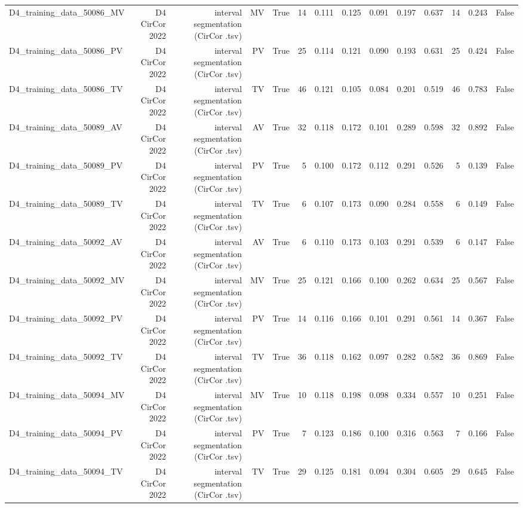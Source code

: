 \begin{table}[htbp]
\begin{tabular}{lrrrrrrrrrrrrr}
    D4\_training\_data\_50086\_MV & D4 CirCor 2022 & interval segmentation (CirCor .tsv) & MV & True & 14 & 0.111 & 0.125 & 0.091 & 0.197 & 0.637 & 14 & 0.243 & False \\
    D4\_training\_data\_50086\_PV & D4 CirCor 2022 & interval segmentation (CirCor .tsv) & PV & True & 25 & 0.114 & 0.121 & 0.090 & 0.193 & 0.631 & 25 & 0.424 & False \\
    D4\_training\_data\_50086\_TV & D4 CirCor 2022 & interval segmentation (CirCor .tsv) & TV & True & 46 & 0.121 & 0.105 & 0.084 & 0.201 & 0.519 & 46 & 0.783 & False \\
    D4\_training\_data\_50089\_AV & D4 CirCor 2022 & interval segmentation (CirCor .tsv) & AV & True & 32 & 0.118 & 0.172 & 0.101 & 0.289 & 0.598 & 32 & 0.892 & False \\
    D4\_training\_data\_50089\_PV & D4 CirCor 2022 & interval segmentation (CirCor .tsv) & PV & True & 5 & 0.100 & 0.172 & 0.112 & 0.291 & 0.526 & 5 & 0.139 & False \\
    D4\_training\_data\_50089\_TV & D4 CirCor 2022 & interval segmentation (CirCor .tsv) & TV & True & 6 & 0.107 & 0.173 & 0.090 & 0.284 & 0.558 & 6 & 0.149 & False \\
    D4\_training\_data\_50092\_AV & D4 CirCor 2022 & interval segmentation (CirCor .tsv) & AV & True & 6 & 0.110 & 0.173 & 0.103 & 0.291 & 0.539 & 6 & 0.147 & False \\
    D4\_training\_data\_50092\_MV & D4 CirCor 2022 & interval segmentation (CirCor .tsv) & MV & True & 25 & 0.121 & 0.166 & 0.100 & 0.262 & 0.634 & 25 & 0.567 & False \\
    D4\_training\_data\_50092\_PV & D4 CirCor 2022 & interval segmentation (CirCor .tsv) & PV & True & 14 & 0.116 & 0.166 & 0.101 & 0.291 & 0.561 & 14 & 0.367 & False \\
    D4\_training\_data\_50092\_TV & D4 CirCor 2022 & interval segmentation (CirCor .tsv) & TV & True & 36 & 0.118 & 0.162 & 0.097 & 0.282 & 0.582 & 36 & 0.869 & False \\
    D4\_training\_data\_50094\_MV & D4 CirCor 2022 & interval segmentation (CirCor .tsv) & MV & True & 10 & 0.118 & 0.198 & 0.098 & 0.334 & 0.557 & 10 & 0.251 & False \\
    D4\_training\_data\_50094\_PV & D4 CirCor 2022 & interval segmentation (CirCor .tsv) & PV & True & 7 & 0.123 & 0.186 & 0.100 & 0.316 & 0.563 & 7 & 0.166 & False \\
    D4\_training\_data\_50094\_TV & D4 CirCor 2022 & interval segmentation (CirCor .tsv) & TV & True & 29 & 0.125 & 0.181 & 0.094 & 0.304 & 0.605 & 29 & 0.645 & False \\

\end{tabular}
\end{table}
